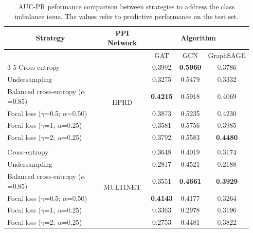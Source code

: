 \begin{table}[!bh]
\centering
\caption{AUC-PR peformance comparison between strategies to address the class imbalance issue. The values refer to predictive performance on the test set. \label{tab:results2_comparison}}
\begin{tabular}{lcccc}
\hline
\multicolumn{1}{c}{Strategy} & PPI Network & \multicolumn{3}{c}{Algorithm}                       \\ \hline
                                  &        & GAT             & GCN             & GraphSAGE       \\ \cline{3-5} 
Cross-entropy                     & \multirow{6}{*}{HPRD}            & 0.3992          & \textbf{0.5960} & 0.3786          \\
Undersampling                     &             & 0.3275          & 0.5479          & 0.3332          \\
Balanced cross-entropy ($\alpha$=0.85) &             & \textbf{0.4215} & 0.5918          & 0.4069          \\
Focal loss ($\gamma$=0.5; $\alpha$=0.50)        &             & 0.3873          & 0.5235          & 0.4230          \\
Focal loss ($\gamma$=1; $\alpha$=0.25)          &             & 0.3581          & 0.5756          & 0.3985          \\
Focal loss ($\gamma$=2; $\alpha$=0.25)          &             & 0.3792          & 0.5583          & \textbf{0.4480} \\
                                  &     &                 &                 &                 \\
Cross-entropy                     & \multirow{6}{*}{MULTINET}            & 0.3648          & 0.4019          & 0.3174          \\
Undersampling                     &             & 0.2817          & 0.4521          & 0.2188          \\
Balanced cross-entropy ($\alpha$=0.85) &             & 0.3551          & \textbf{0.4661} & \textbf{0.3929} \\
Focal loss ($\gamma$=0.5; $\alpha$=0.50)        &             & \textbf{0.4143} & 0.4177          & 0.3264          \\
Focal loss ($\gamma$=1; $\alpha$=0.25)          &             & 0.3363          & 0.2978          & 0.3196          \\
Focal loss ($\gamma$=2; $\alpha$=0.25)          &             & 0.2753          & 0.4481          & 0.3822          \\

\end{tabular}
\end{table}
